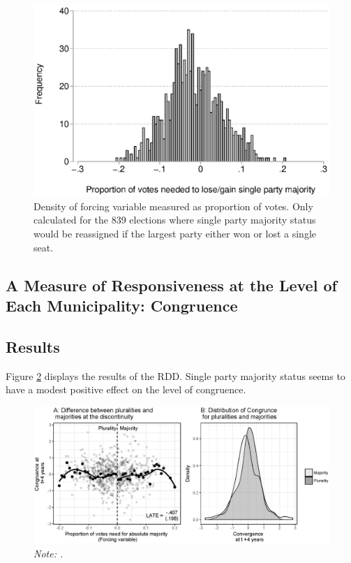 \documentclass[a4paper,12pt]{article}
\newcommand\fnote[1]{\captionsetup{font=small}\caption*{#1}}
\begin{document}
\begin{figure}[htbp] 
	\centering

	\includegraphics[width=1\textwidth]{distpct.eps}
	\caption{Density of forcing variable measured as proportion of votes. Only calculated for the 839 elections where single party majority status would be reassigned if the largest party either won or lost a single seat.}
	\label{figure:forcing}
\end{figure}

\subsection{A Measure of Responsiveness at the Level of Each Municipality: Congruence}



\subsection{Results}

Figure 	\ref{fig:PermTest} displays the results of the RDD. Single party majority status seems to have a modest positive effect on the level of congruence. 


	\begin{figure}[h]
		\centering
		\includegraphics[width=1\textwidth]{rddCongruence.eps}
		\caption{\textbf{.}} \fnote{\emph{Note: .}}
		\label{fig:PermTest}
	\end{figure}
\end{document}
